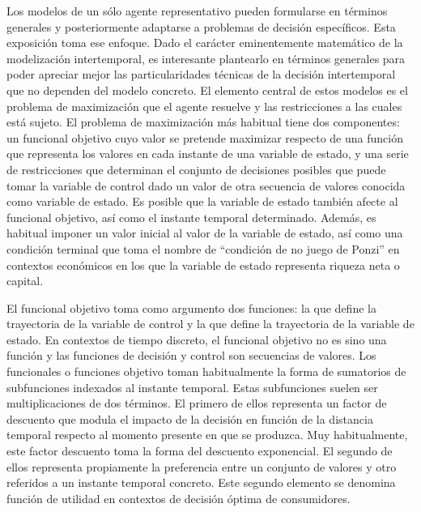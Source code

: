 \documentclass{nuevotema}
\begin{document}
Los modelos de un sólo agente representativo pueden formularse en términos generales y posteriormente adaptarse a problemas de decisión específicos. Esta exposición toma ese enfoque. Dado el carácter eminentemente matemático de la modelización intertemporal, es interesante plantearlo en términos generales para poder apreciar mejor las particularidades técnicas de la decisión intertemporal que no dependen del modelo concreto. El elemento central de estos modelos es el problema de maximización que el agente resuelve y las restricciones a las cuales está sujeto. El problema de maximización más habitual tiene dos componentes: un funcional objetivo cuyo valor se pretende maximizar respecto de una función que representa los valores en cada instante de una variable de estado, y una serie de restricciones que determinan el conjunto de decisiones posibles que puede tomar la variable de control dado un valor de otra secuencia de valores conocida como variable de estado. Es posible que la variable de estado también afecte al funcional objetivo, así como el instante temporal determinado. Además, es habitual imponer un valor inicial al valor de la variable de estado, así como una condición terminal que toma el nombre de ``condición de no juego de Ponzi'' en contextos económicos en los que la variable de estado representa riqueza neta o capital. 

El funcional objetivo toma como argumento dos funciones: la que define la trayectoria de la variable de control y la que define la trayectoria de la variable de estado. En contextos de tiempo discreto, el funcional objetivo no es sino una función y las funciones de decisión y control son secuencias de valores. Los funcionales o funciones objetivo toman habitualmente la forma de sumatorios de subfunciones indexados al instante temporal. Estas subfunciones suelen ser multiplicaciones de dos términos. El primero de ellos representa un factor de descuento que modula el impacto de la decisión en función de la distancia temporal respecto al momento presente en que se produzca. Muy habitualmente, este factor descuento toma la forma del descuento exponencial. El segundo de ellos representa propiamente la preferencia entre un conjunto de valores y otro referidos a un instante temporal concreto. Este segundo elemento se denomina función de utilidad en contextos de decisión óptima de consumidores. 
\end{document}
